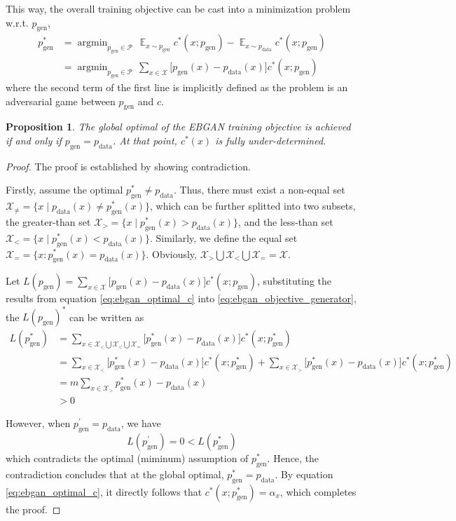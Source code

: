 \documentclass[a4paper]{article}
\newtheorem{proposition}{Proposition}[section]
\newcommand{\pd}{p_\text{data}}
\newcommand{\pg}{p_\text{gen}}
\DeclareMathOperator*{\E}{\mathbb{E}}
\DeclareMathOperator*{\argmin}{\arg\min}
\begin{document}
This way, the overall training objective can be cast into a minimization problem w.r.t. $\pg$,
\begin{equation}
\label{eq:ebgan_objective_generator}
\begin{aligned}
\pg^* &= \argmin_{\pg \in \mathcal{P}} \, \E_{x \sim \pg} c^*(x; \pg) - \E_{x \sim \pd} c^*(x; \pg) \\
&= \argmin_{\pg \in \mathcal{P}} \, \sum_{x \in \mathcal{X}} \Big[\pg(x) - \pd(x)\Big] c^*(x; \pg)
\end{aligned}
\end{equation}
where the second term of the first line is implicitly defined as the problem is an adversarial game between $\pg$ and $c$.

\begin{proposition}
The global optimal of the EBGAN training objective is achieved if and only if $\pg = \pd$. At that point, $c^*(x)$ is fully under-determined.
\end{proposition}

\begin{proof}

The proof is established by showing contradiction. 

Firstly, assume the optimal $\pg^* \neq \pd$. 
Thus, there must exist a non-equal set $\mathcal{X}_{\neq} = \{x \mid \pd(x) \neq \pg^*(x) \}$, which can be further splitted into two subsets, 
the greater-than set $\mathcal{X}_{>} = \{x \mid \pg^*(x) > \pd(x)\}$,
and the less-than set $\mathcal{X}_{<} = \{x \mid \pg^*(x) < \pd(x)\}$.
Similarly, we define the equal set $\mathcal{X}_{=} = \{x : \pg^*(x) = \pd(x)\}$.
Obviously, $\mathcal{X}_{>} \bigcup \mathcal{X}_{<} \bigcup \mathcal{X}_{=} = \mathcal{X}$.

Let $L(\pg) = \sum_{x \in \mathcal{X}} \Big[\pg(x) - \pd(x)\Big] c^*(x; \pg)$, substituting the results from equation \eqref{eq:ebgan_optimal_c} into \eqref{eq:ebgan_objective_generator}, the $L(\pg)^*$ can be written as
\begin{equation}
\label{eq:val_g}
\begin{aligned}
L(\pg^*)
&= \sum_{x \in \mathcal{X}_{<} \bigcup \mathcal{X}_{<} \bigcup \mathcal{X}_{=}} \big[ \pg^*(x) - \pd(x) \big] c^*(x; \pg^*) \\
&= \sum_{x \in \mathcal{X}_{<}} \big[ \pg^*(x) - \pd(x) \big] c^*(x; \pg^*) + \sum_{x \in \mathcal{X}_{>}} \big[ \pg^*(x) - \pd(x) \big] c^*(x; \pg^*) \\
&= m\sum_{x \in \mathcal{X}_{>}} \pg^*(x) - \pd(x) \\
&> 0
\end{aligned}
\end{equation}

However, when $\pg^\prime = \pd$, we have
\begin{equation}
\label{eq:val_g_opt}
L(\pg^\prime) = 0 < L(\pg^*)
\end{equation}
which contradicts the optimal (miminum) assumption of $\pg^*$.
Hence, the contradiction concludes that at the global optimal, $\pg^* = \pd$.
By equation \eqref{eq:ebgan_optimal_c}, it directly follows that $c^*(x; \pg^*) = \alpha_x$,
which completes the proof.
\end{proof}
\end{document}
